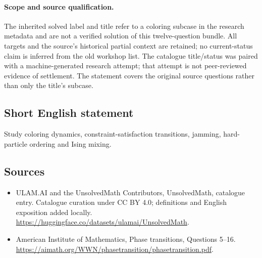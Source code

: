 \documentclass[11pt]{article}
\begin{document}
\paragraph{Scope and source qualification.}The inherited solved label and title refer to a coloring subcase in the research metadata and are not a verified solution of this twelve-question bundle. All targets and the source’s historical partial context are retained; no current-status claim is inferred from the old workshop list. The catalogue title/status was paired with a machine-generated research attempt; that attempt is not peer-reviewed evidence of settlement. The statement covers the original source questions rather than only the title’s subcase.
\subsection{Short English statement}
Study coloring dynamics, constraint-satisfaction transitions, jamming, hard-particle ordering and Ising mixing.
\subsection{Sources}
\begin{itemize}
\item[\hypertarget{source:statement:1}{S1}] ULAM.AI and the UnsolvedMath Contributors, UnsolvedMath, catalogue entry. Catalogue curation under CC BY 4.0; definitions and English exposition added locally.
\url{https://huggingface.co/datasets/ulamai/UnsolvedMath}.
\item[\hypertarget{source:statement:2}{S2}] American Institute of Mathematics, Phase transitions, Questions 5–16.
\url{https://aimath.org/WWN/phasetransition/phasetransition.pdf}.
\end{itemize}
\label{end:statement}
\end{document}
